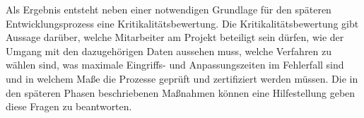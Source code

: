 Als Ergebnis entsteht neben einer notwendigen Grundlage für den späteren Entwicklungsprozess eine Kritikalitätsbewertung.
Die Kritikalitätsbewertung gibt Aussage darüber, welche Mitarbeiter am Projekt beteiligt sein dürfen, wie der Umgang mit den dazugehörigen Daten aussehen muss, welche Verfahren zu wählen sind, was maximale Eingriffs- und Anpassungszeiten im Fehlerfall sind und in welchem Maße die Prozesse geprüft und zertifiziert werden müssen.
Die in den späteren Phasen beschriebenen Maßnahmen können eine Hilfestellung geben diese Fragen zu beantworten.

